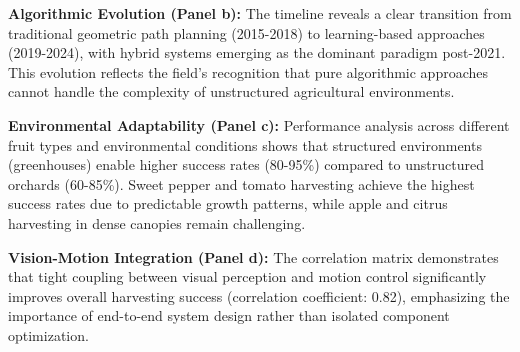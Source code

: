 \documentclass[a4paper,fleqn]{cas-dc}
\begin{document}
\textbf{Algorithmic Evolution (Panel b):} The timeline reveals a clear transition from traditional geometric path planning (2015-2018) to learning-based approaches (2019-2024), with hybrid systems emerging as the dominant paradigm post-2021. This evolution reflects the field's recognition that pure algorithmic approaches cannot handle the complexity of unstructured agricultural environments.

\textbf{Environmental Adaptability (Panel c):} Performance analysis across different fruit types and environmental conditions shows that structured environments (greenhouses) enable higher success rates (80-95\%) compared to unstructured orchards (60-85\%). Sweet pepper and tomato harvesting achieve the highest success rates due to predictable growth patterns, while apple and citrus harvesting in dense canopies remain challenging.

\textbf{Vision-Motion Integration (Panel d):} The correlation matrix demonstrates that tight coupling between visual perception and motion control significantly improves overall harvesting success (correlation coefficient: 0.82), emphasizing the importance of end-to-end system design rather than isolated component optimization.
\end{document}
